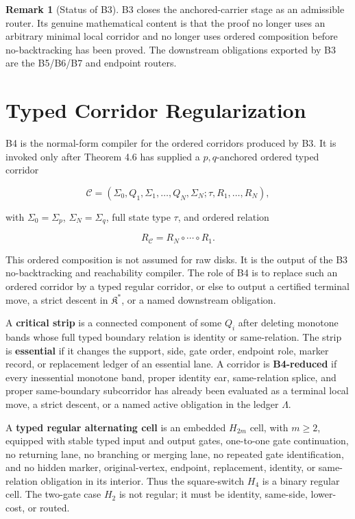 \documentclass[11pt]{amsart}
\theoremstyle{definition}
\newtheorem{remark}[theorem]{Remark}
\begin{document}
\begin{remark}[Status of B3]
B3 closes the anchored-carrier stage as an admissible router. Its genuine mathematical content is that the proof no longer uses an arbitrary minimal local corridor and no longer uses ordered composition before no-backtracking has been proved. The downstream obligations exported by B3 are the B5/B6/B7 and endpoint routers.


\end{remark}
\section{Typed Corridor Regularization}

B4 is the normal-form compiler for the ordered corridors produced by B3. It is invoked only after Theorem 4.6 has supplied a \(p,q\)-anchored ordered typed corridor

\[
\mathcal C=(\Sigma_0,Q_1,\Sigma_1,\ldots,Q_N,\Sigma_N;\tau,R_1,\ldots,R_N),
\]

with \(\Sigma_0=\Sigma_p\), \(\Sigma_N=\Sigma_q\), full state type \(\tau\), and ordered relation

\[
R_{\mathcal C}=R_N\circ\cdots\circ R_1.
\]

This ordered composition is not assumed for raw disks. It is the output of the B3 no-backtracking and reachability compiler. The role of B4 is to replace such an ordered corridor by a typed regular corridor, or else to output a certified terminal move, a strict descent in \(\mathfrak K^\ast\), or a named downstream obligation.

A \textbf{critical strip} is a connected component of some \(Q_i\) after deleting monotone bands whose full typed boundary relation is identity or same-relation. The strip is \textbf{essential} if it changes the support, side, gate order, endpoint role, marker record, or replacement ledger of an essential lane. A corridor is \textbf{B4-reduced} if every inessential monotone band, proper identity ear, same-relation splice, and proper same-boundary subcorridor has already been evaluated as a terminal local move, a strict descent, or a named active obligation in the ledger \(\Lambda\).

A \textbf{typed regular alternating cell} is an embedded \(H_{2m}\) cell, with \(m\ge2\), equipped with stable typed input and output gates, one-to-one gate continuation, no returning lane, no branching or merging lane, no repeated gate identification, and no hidden marker, original-vertex, endpoint, replacement, identity, or same-relation obligation in its interior. Thus the square-switch \(H_4\) is a binary regular cell. The two-gate case \(H_2\) is not regular; it must be identity, same-side, lower-cost, or routed.
\end{document}
